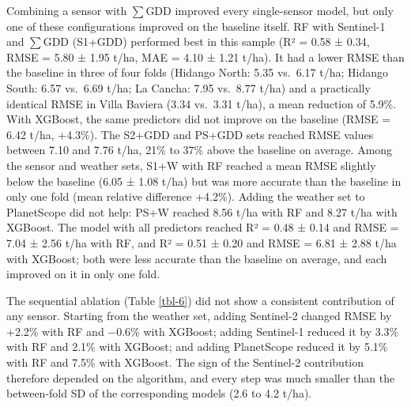 \documentclass[
  english,
  review,
  number,
  sort,compress,
  authoryear,
  3p]{elsarticle}
\begin{document}
Combining a sensor with \(\sum\)GDD improved every single-sensor model,
but only one of these configurations improved on the baseline itself. RF
with Sentinel-1 and \(\sum\)GDD (S1+GDD) performed best in this sample
(R² = 0.58 ± 0.34, RMSE = 5.80 ± 1.95 t/ha, MAE = 4.10 ± 1.21 t/ha). It
had a lower RMSE than the baseline in three of four folds (Hidango
North: 5.35 vs.~6.17 t/ha; Hidango South: 6.57 vs.~6.69 t/ha; La Cancha:
7.95 vs.~8.77 t/ha) and a practically identical RMSE in Villa Baviera
(3.34 vs.~3.31 t/ha), a mean reduction of 5.9\%. With XGBoost, the same
predictors did not improve on the baseline (RMSE = 6.42 t/ha, +4.3\%).
The S2+GDD and PS+GDD sets reached RMSE values between 7.10 and 7.76
t/ha, 21\% to 37\% above the baseline on average. Among the sensor and
weather sets, S1+W with RF reached a mean RMSE slightly below the
baseline (6.05 ± 1.08 t/ha) but was more accurate than the baseline in
only one fold (mean relative difference +4.2\%). Adding the weather set
to PlanetScope did not help: PS+W reached 8.56 t/ha with RF and 8.27
t/ha with XGBoost. The model with all predictors reached R² = 0.48 ±
0.14 and RMSE = 7.04 ± 2.56 t/ha with RF, and R² = 0.51 ± 0.20 and RMSE
= 6.81 ± 2.88 t/ha with XGBoost; both were less accurate than the
baseline on average, and each improved on it in only one fold.

The sequential ablation (Table \ref{tbl-6}) did not show a consistent
contribution of any sensor. Starting from the weather set, adding
Sentinel-2 changed RMSE by +2.2\% with RF and −0.6\% with XGBoost;
adding Sentinel-1 reduced it by 3.3\% with RF and 2.1\% with XGBoost;
and adding PlanetScope reduced it by 5.1\% with RF and 7.5\% with
XGBoost. The sign of the Sentinel-2 contribution therefore depended on
the algorithm, and every step was much smaller than the between-fold SD
of the corresponding models (2.6 to 4.2 t/ha).
\end{document}
